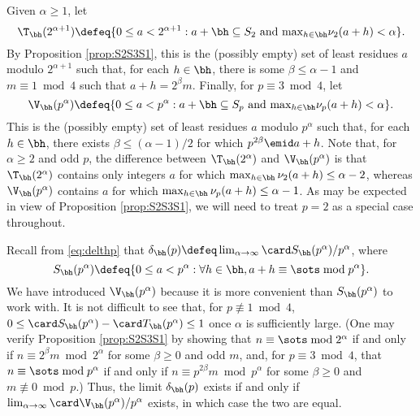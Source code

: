 \documentclass[12pt, reqno, twoside, letterpaper]{amsart}
\begin{document}
Given $\alpha \ge 1$, let 
\begin{equation}
 \label{eq:defTh}
  \T_{\bh}(2^{\alpha + 1})
   \defeq 
    \{0 \le a < 2^{\alpha + 1} : a + \bh \subseteq S_2 
      \,\, \hbox{and} \,\, 
       {\textstyle \max_{h \in \bh}} \nu_2(a + h) < \alpha\}.
\end{equation}
%
By Proposition \ref{prop:S2S3S1}, this is the (possibly empty) set 
of least residues $a$ modulo $2^{\alpha + 1}$ such that, for each  
$h \in \bh$, there is some $\beta \le \alpha - 1$ and 
$m \equiv 1 \bmod 4$ such that $a + h = 2^{\beta}m$.
%
Finally, for $p \equiv 3 \bmod 4$, let 
\begin{equation}
 \label{eq:defVh}
  \V_{\bh}(p^{\alpha})
   \defeq 
    \{0 \le a < p^{\alpha} : a + \bh \subseteq S_p 
      \,\, \hbox{and} \,\, 
       {\textstyle \max_{h \in \bh}} \nu_p(a + h) < \alpha\}.
\end{equation}
%
This is the (possibly empty) set of least residues $a$ modulo 
$p^{\alpha}$ such that, for each $h \in \bh$, there exists 
$\beta \le (\alpha - 1)/2$ for which $p^{2\beta} \emid a + h$. 
%
Note that, for $\alpha \ge 2$ and odd $p$, the difference between 
$\T_{\bh}(2^{\alpha})$ and $\V_{\bh}(p^{\alpha})$ is that 
$\T_{\bh}(2^{\alpha})$ contains only integers $a$ for which 
$\max_{h \in \bh} \nu_2(a + h) \le \alpha - 2$, whereas 
$\V_{\bh}(p^{\alpha})$ contains $a$ for which 
$\max_{h \in \bh} \nu_p(a + h) \le \alpha - 1$.
%
As may be expected in view of Proposition \ref{prop:S2S3S1}, we 
will need to treat $p = 2$ as a special case throughout.

Recall from \eqref{eq:delthp} that  
$
 \delta_{\bh}(p) 
  \defeq 
   \lim_{\alpha \to \infty} \card S_{\bh}(p^{\alpha})/p^{\alpha}
$, where 
\[
 S_{\bh}(p^{\alpha}) 
  \defeq 
   \{0 \le a < p^{\alpha} : \forall h \in \bh, a + h \equiv \sots \bmod p^{\alpha}\}.
\]
%
We have introduced $\V_{\bh}(p^{\alpha})$ because it is more 
convenient than $S_{\bh}(p^{\alpha})$ to work with.
%
It is not difficult to see that, for $p \not\equiv 1 \bmod 4$, 
$
 0 
  \le 
   \card S_{\bh}(p^{\alpha}) - \card T_{\bh}(p^{\alpha}) 
    \le 1
$ 
once $\alpha$ is sufficiently large.
%
(One may verify Proposition \ref{prop:S2S3S1} by showing 
that $n \equiv \sots \bmod 2^{\alpha}$ if and only if 
$n \equiv 2^{\beta}m \bmod 2^{\alpha}$ for some $\beta \ge 0$ and 
odd $m$, and, for $p \equiv 3 \bmod 4$, that 
$n \equiv \sots \bmod p^{\alpha}$ if and only if
$n \equiv p^{2\beta}m \bmod p^{\alpha}$ for some $\beta \ge 0$ 
and $m \not\equiv 0 \bmod p$.) 
%
Thus, the limit $\delta_{\bh}(p)$ exists if and only if 
$\lim_{\alpha \to \infty} \card \V_{\bh}(p^{\alpha})/p^{\alpha}$ 
exists, in which case the two are equal.
\end{document}
